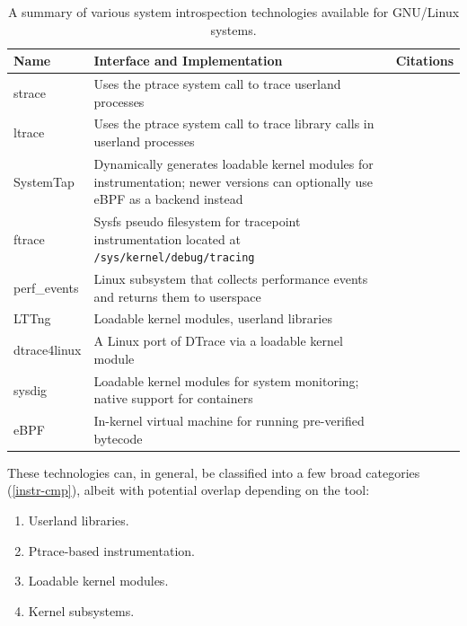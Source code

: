 \documentclass[
  12pt]{findlay}
\begin{document}
\begin{table}
\caption{A summary of various system introspection technologies available for GNU/Linux systems.}
\label{introspection-summary}
\begin{center}
\begin{tabular}{|l|p{3.8in}|l|}
\hline
\textbf{Name} & \textbf{Interface and Implementation} & \textbf{Citations}\\
\hline
\hline
strace & Uses the ptrace system call to trace userland processes & \cite{strace, manstrace}  \\
\hline
ltrace & Uses the ptrace system call to trace library calls in userland processes & \cite{rubirabranco07, manltrace}  \\
\hline
SystemTap & Dynamically generates loadable kernel modules for instrumentation; newer versions can optionally use eBPF as a backend instead &  \cite{systemtap, merey17}\\
\hline
ftrace & Sysfs pseudo filesystem for tracepoint instrumentation located at \texttt{/sys/kernel/debug/tracing} & \cite{ftrace}\\
\hline
perf\_events & Linux subsystem that collects performance events and returns them to userspace & \cite{manperfeventopen}  \\
\hline
LTTng & Loadable kernel modules, userland libraries & \cite{lttng}\\
\hline
dtrace4linux & A Linux port of DTrace via a loadable kernel module & \cite{dtrace4linux} \\
\hline
sysdig & Loadable kernel modules for system monitoring; native support for containers & \cite{sysdig} \\
\hline
eBPF & In-kernel virtual machine for running pre-verified bytecode & \cite{bcc, goldstein16, starovoitov13, starovoitov14} \\
\hline
\end{tabular}
\end{center}
\end{table}

These technologies can, in general, be classified into a few broad
categories (\autoref{instr-cmp}), albeit with potential overlap
depending on the tool:

\begin{enumerate}
\def\labelenumi{(\arabic{enumi})}
\tightlist
\item
  Userland libraries.
\item
  Ptrace-based instrumentation.
\item
  Loadable kernel modules.
\item
  Kernel subsystems.
\end{enumerate}
\end{document}
